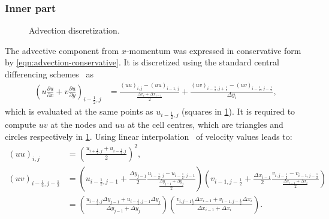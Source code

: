 \documentclass{article}
\numberwithin{equation}{section}
\begin{document}
\subsubsection{Inner part}\label{subsubsec:advection-inner}
\begin{figure}[H] %
  \caption{Advection discretization.}\label{fig:ADV}
\end{figure}
The advective component from $x$-momentum was expressed in conservative form by \cref{eqn:advection-conservative}. It is discretized using the standard central differencing schemes~\cite{Colonius:2008} as
\begin{align}\label{eqn:adv-inner}
	\left (u\frac{\partial u}{\partial x}+v \frac{\partial u}{\partial y}\right)_{i-\frac{1}{2},j}&=\frac{(uu)_{i
	,j}-(uu)_{i- 1,j}}{\frac{\Delta x_i+\Delta x_{i-1}}{2}}+\frac{(uv)_{i-\frac{1}{2},j+\frac{1}{2}}-(uv)_{i-\frac{1}{2},j-\frac{1}{2}}}{\Delta y_i},
\end{align}
which is evaluated at the same points as $u_{i-\frac{1}{2},j}$ (squares in \cref{fig:ADV}). It is required to compute $uv$ at the nodes and $uu$ at the cell centres, which are triangles and circles respectively in \cref{fig:ADV}. Using linear interpolation~\cite{Colonius:2008} of velocity values leads to:
\begin{align*}
  (uu)_{i,j}&=\left(\frac{u_{i+\frac{1}{2},j}+u_{i-\frac{1}{2},j}}{2}\right)^2,\\
  (uv)_{i-\frac{1}{2},j-\frac{1}{2}}&=\left(u_{i-\frac{1}{2},j-1} + \frac{\Delta y_{j-1}}{2}\frac{u_{i-\frac{1}{2},j}-u_{i-\frac{1}{2},j-1}}{\frac{\Delta y_{j-1} +\Delta y_j}{2}} \right) \left( v_{i-1,j-\frac{1}{2}} + \frac{\Delta x_{i-1}}{2}\frac{v_{i,j-\frac{1}{2}}-v_{i-1,j-\frac{1}{2}}}{\frac{\Delta x_{i-1} +\Delta x_i}{2}}\right)\\
  &=\left(\frac{u_{i-\frac{1}{2},j}\Delta y_{j-1} +u_{i-\frac{1}{2},j-1}\Delta y_j}{\Delta y_{j-1}+\Delta y_{j}}\right )\left ( \frac{v_{i,j-1\frac{1}{2}}\Delta x_{i-1} +v_{i-1,j-\frac{1}{2}}\Delta x_i}{\Delta x_{i-1}+\Delta x_{i}}\right).
\end{align*}
\end{document}
